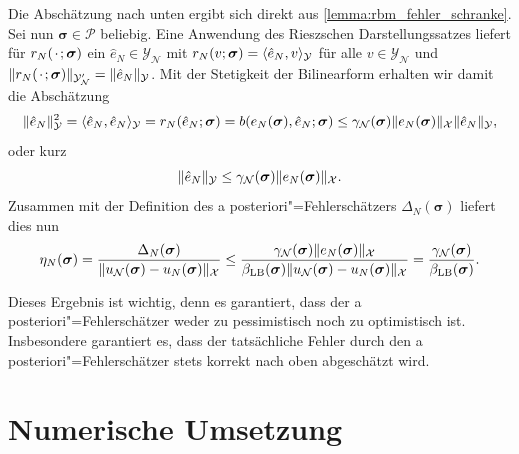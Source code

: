 \documentclass[../main.tex]{subfiles}
\begin{document}
\begin{Lemma}
    \begin{Beweis}
        Die Abschätzung nach unten ergibt sich direkt aus \cref{lemma:rbm_fehler_schranke}.
        Sei nun $\bm \sigma \in \mathcal P$ beliebig.
        Eine Anwendung des Rieszschen Darstellungssatzes liefert für $r_{N}({\mkern2mu\cdot\mkern2mu}; \bm \sigma)$ ein $\hat{e}_{N} \in \mathcal Y_{\mathcal N}$ mit $r_{N}(v; \bm \sigma) = \langle\hat{e}_{N},v\rangle_{\mathcal Y}$ für alle $v \in \mathcal Y_{\mathcal N}$ und $\lVert r_{N}({\mkern2mu\cdot\mkern2mu}; \bm \sigma)\rVert_{\mathcal Y_{\mathcal N}'} = \lVert\hat{e}_{N}\rVert_{\mathcal Y}$.
        Mit der Stetigkeit der Bilinearform erhalten wir damit die Abschätzung
        \begin{equation}
            \lVert\hat{e}_{N}\rVert_{\mathcal Y}^{2}
            = \langle\hat{e}_{N},\hat{e}_{N}\rangle_{\mathcal Y}
            = r_{N}(\hat{e}_{N}; \bm \sigma)
            = b(e_{N}(\bm \sigma), \hat{e}_{N}; \bm \sigma)
            \leq \gamma_{\mathcal N}(\bm \sigma) \lVert e_{N}(\bm \sigma)\rVert_{\mathcal X} \lVert\hat{e}_{N}\rVert_{\mathcal Y},
        \end{equation}
        oder kurz
        \begin{equation}
            \lVert\hat{e}_{N}\rVert_{\mathcal Y} \leq \gamma_{\mathcal N}(\bm \sigma) \lVert e_{N}(\bm \sigma)\rVert_{\mathcal X}.
        \end{equation}
        Zusammen mit der Definition des a posteriori"=Fehlerschätzers $\Delta_{N}(\bm \sigma)$ liefert dies nun
        \begin{equation}
            \eta_{N}(\bm \sigma)
            = \frac{\Delta_{N}(\bm \sigma)}{\lVert u_{\mathcal N}(\bm \sigma) - u_{N}(\bm \sigma)\rVert_{\mathcal X}}
            \leq \frac{\gamma_{\mathcal N}(\bm \sigma) \lVert e_{N}(\bm \sigma)\rVert_{\mathcal X}}{\beta_{\mathrm{LB}}(\bm \sigma)\lVert u_{\mathcal N}(\bm \sigma) - u_{N}(\bm \sigma)\rVert_{\mathcal X}}
            = \frac{\gamma_{\mathcal N}(\bm \sigma)}{\beta_{\mathrm{LB}}(\bm \sigma)}.
        \end{equation}
    \end{Beweis}
\end{Lemma}

Dieses Ergebnis ist wichtig, denn es garantiert, dass der a posteriori"=Fehlerschätzer weder zu pessimistisch noch zu optimistisch ist.
Insbesondere garantiert es, dass der tatsächliche Fehler durch den a posteriori"=Fehlerschätzer stets korrekt nach oben abgeschätzt wird.

\section{Numerische Umsetzung} %
\label{section:cha5_rbm:numerische_umsetzung}
\end{document}
